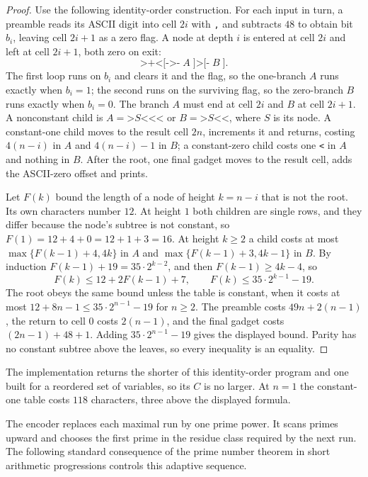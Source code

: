 \documentclass[11pt]{article}
\theoremstyle{remark}
\begin{document}
\begin{proof}
Use the following identity-order construction.  For each input in turn, a
preamble reads its ASCII digit into cell $2i$ with \texttt{,} and subtracts
$48$ to obtain bit $b_i$, leaving cell $2i+1$ as a zero flag.  A node at depth
$i$ is entered at cell $2i$ and left at cell $2i+1$, both zero on exit:
\[
  \texttt{>+<[->-}\;A\;\texttt{]>[-}\;B\;\texttt{]}.
\]
The first loop runs on $b_i$ and clears it and the flag, so the one-branch
$A$ runs exactly when $b_i=1$; the second runs on the surviving flag, so the
zero-branch $B$ runs exactly when $b_i=0$.  The branch $A$ must end at cell
$2i$ and $B$ at cell $2i+1$.  A nonconstant child is
$A=\texttt{>}S\texttt{<<<}$ or $B=\texttt{>}S\texttt{<<}$, where $S$ is its
node.  A constant-one child moves to the result cell $2n$, increments it and
returns, costing $4(n-i)$ in $A$ and $4(n-i)-1$ in $B$; a constant-zero child
costs one \texttt{<} in $A$ and nothing in $B$.  After the root, one final
gadget moves to the result cell, adds the ASCII-zero offset and prints.

Let $F(k)$ bound the length of a node of height $k=n-i$ that is not the
root.  Its own characters number $12$.  At height $1$ both children are
single rows, and they differ because the node's subtree is not constant, so
$F(1)=12+4+0=12+1+3=16$.  At height $k\ge2$ a child costs at most
$\max\{F(k-1)+4,4k\}$ in $A$ and $\max\{F(k-1)+3,4k-1\}$ in $B$.  By
induction $F(k-1)+19=35\cdot2^{k-2}$, and then $F(k-1)\ge4k-4$, so
\[
  F(k)\le12+2F(k-1)+7,
  \qquad
  F(k)\le35\cdot2^{k-1}-19.
\]
The root obeys the same bound unless the table is constant, when it costs at
most $12+8n-1\le35\cdot2^{n-1}-19$ for $n\ge2$.  The preamble costs
$49n+2(n-1)$, the return to cell $0$ costs $2(n-1)$, and the final gadget
costs $(2n-1)+48+1$.  Adding $35\cdot2^{n-1}-19$ gives the displayed bound.
Parity has no constant subtree above the leaves, so every inequality is an
equality.
\end{proof}

The implementation returns the shorter of this identity-order program and one
built for a reordered set of variables, so its $C$ is no larger.  At $n=1$ the
constant-one table costs $118$ characters, three above the displayed formula.

The encoder replaces each maximal run by one prime power.  It scans
primes upward and chooses the first prime in the residue class required by
the next run.  The following standard consequence of the prime number theorem
in short arithmetic progressions controls this adaptive sequence.
\end{document}
